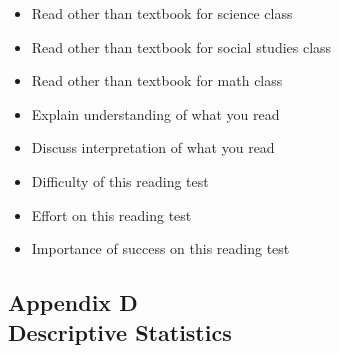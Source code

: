 \documentclass[letterpaper,12p,twoside]{article} %
\begin{document}
\begin{singlespace}
\begin{itemize}
	\item Read other than textbook for science class
	\item Read other than textbook for social studies class
	\item Read other than textbook for math class
	\item Explain understanding of what you read
	\item Discuss interpretation of what you read
	\item Difficulty of this reading test
	\item Effort on this reading test
	\item Importance of success on this reading test
\end{itemize}

\end{singlespace}


\newpage
{}
\subsection*{Appendix D\\Descriptive Statistics}
\label{appendixDescriptives}
\end{document}
